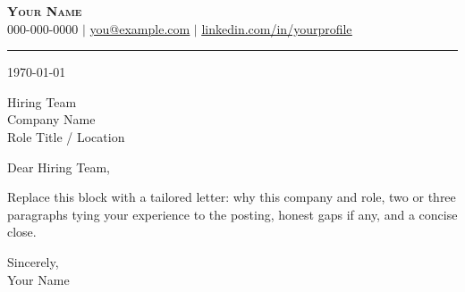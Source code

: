 \documentclass[letterpaper,11pt]{article}
\begin{document}
\begin{center}
    \textbf{\Huge \scshape Your Name} \\ \vspace{2pt}
    \small 000-000-0000 $|$ \href{mailto:you@example.com}{\underline{you@example.com}} $|$
    \href{https://linkedin.com/in/yourprofile}{\underline{linkedin.com/in/yourprofile}}
\end{center}

\vspace{6pt}
\hrule
\vspace{12pt}

\today

\vspace{2pt}

Hiring Team \\
Company Name \\
Role Title / Location

\vspace{6pt}

Dear Hiring Team,

Replace this block with a tailored letter: why this company and role, two or three paragraphs tying your experience to the posting, honest gaps if any, and a concise close.

\vspace{8pt}

Sincerely, \\
Your Name
\end{document}
